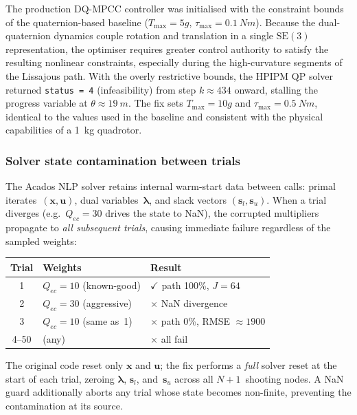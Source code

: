 The production DQ-MPCC controller was initialised with the constraint
bounds of the quaternion-based baseline
($T_{\max} = 5g$, $\tau_{\max} = \SI{0.1}{Nm}$).
Because the dual-quaternion dynamics couple rotation and translation
in a single $\mathrm{SE}(3)$ representation, the optimiser requires
greater control authority to satisfy the resulting nonlinear
constraints, especially during the high-curvature segments of
the Lissajous path.
With the overly restrictive bounds, the HPIPM QP solver returned
\texttt{status\,=\,4} (infeasibility) from step $k \approx 434$
onward, stalling the progress variable at $\theta \approx \SI{19}{m}$.
The fix sets $T_{\max} = 10g$ and $\tau_{\max} = \SI{0.5}{Nm}$,
identical to the values used in the baseline and consistent
with the physical capabilities of a \SI{1}{kg} quadrotor.


\subsubsection{Solver state contamination between trials}
\label{sec:bug_warmstart}

The Acados NLP solver retains internal warm-start data between
calls: primal iterates~$(\mathbf{x},\mathbf{u})$, dual
variables~$\boldsymbol{\lambda}$, and slack vectors
$(\mathbf{s}_l,\mathbf{s}_u)$.
When a trial diverges (e.g.\ $Q_{ec}=30$ drives the state to NaN),
the corrupted multipliers propagate to \emph{all subsequent trials},
causing immediate failure regardless of the sampled weights:
%
\begin{center}
\small
\begin{tabular}{@{}cll@{}}
  \toprule
  Trial & Weights & Result \\
  \midrule
  1 & $Q_{ec}=10$ (known-good) & $\checkmark$ path 100\%, $J=64$ \\
  2 & $Q_{ec}=30$ (aggressive) & $\times$ NaN divergence \\
  3 & $Q_{ec}=10$ (same as~1)  & $\times$ path 0\%, RMSE $\approx1900$ \\
  4--50 & (any) & $\times$ all fail \\
  \bottomrule
\end{tabular}
\end{center}
%
The original code reset only $\mathbf{x}$ and $\mathbf{u}$;
the fix performs a \emph{full} solver reset at the start of
each trial, zeroing $\boldsymbol{\lambda}$, $\mathbf{s}_l$,
and~$\mathbf{s}_u$ across all $N+1$~shooting nodes.
A NaN guard additionally aborts any trial whose state
becomes non-finite, preventing the contamination at its source.


